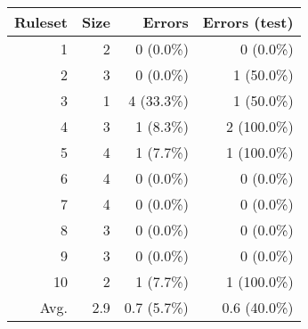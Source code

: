 \documentclass{article}
\begin{document}
\begin{itemize}
\begin{tabular}{|r|r|r|r|}
\hline
 Ruleset & Size & Errors        & Errors (test) \\
\hline\hline
       1 &    2 &    0 (0.0\%)  &    0 (0.0\%)   \\
       2 &    3 &    0 (0.0\%)  &    1 (50.0\%)  \\
       3 &    1 &    4 (33.3\%) &    1 (50.0\%)  \\
       4 &    3 &    1 (8.3\%)  &    2 (100.0\%) \\
       5 &    4 &    1 (7.7\%)  &    1 (100.0\%) \\
       6 &    4 &    0 (0.0\%)  &    0 (0.0\%)   \\
       7 &    4 &    0 (0.0\%)  &    0 (0.0\%)   \\
       8 &    3 &    0 (0.0\%)  &    0 (0.0\%)   \\
       9 &    3 &    0 (0.0\%)  &    0 (0.0\%)   \\
      10 &    2 &    1 (7.7\%)  &    1 (100.0\%) \\
\hline\hline
    Avg. &  2.9 &  0.7 (5.7\%)  &  0.6 (40.0\%)  \\
\hline
\end{tabular}



\end{itemize}
\end{document}
